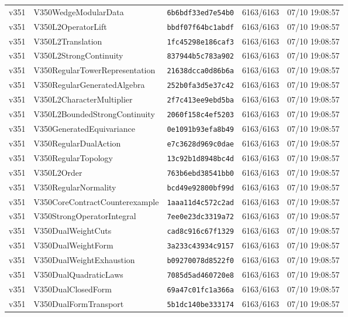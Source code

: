 \documentclass[11pt]{article}
\theoremstyle{definition}\newtheorem{deriv}{Derivation}
\begin{document}
{\begin{longtable}{@{}lllll@{}}
v351 & V350WedgeModularData & \texttt{6b6bdf33ed7e54b0} & 6163/6163 & 07/10 19:08:57 \\
v351 & V350L2OperatorLift & \texttt{bbdf07f64bc1abdf} & 6163/6163 & 07/10 19:08:57 \\
v351 & V350L2Translation & \texttt{1fc45298e186caf3} & 6163/6163 & 07/10 19:08:57 \\
v351 & V350L2StrongContinuity & \texttt{837944b5c783a902} & 6163/6163 & 07/10 19:08:57 \\
v351 & V350RegularTowerRepresentation & \texttt{21638dcca0d86b6a} & 6163/6163 & 07/10 19:08:57 \\
v351 & V350RegularGeneratedAlgebra & \texttt{252b0fa3d5e37c42} & 6163/6163 & 07/10 19:08:57 \\
v351 & V350L2CharacterMultiplier & \texttt{2f7c413ee9ebd5ba} & 6163/6163 & 07/10 19:08:57 \\
v351 & V350L2BoundedStrongContinuity & \texttt{2060f158c4ef5203} & 6163/6163 & 07/10 19:08:57 \\
v351 & V350GeneratedEquivariance & \texttt{0e1091b93efa8b49} & 6163/6163 & 07/10 19:08:57 \\
v351 & V350RegularDualAction & \texttt{e7c3628d969c0dae} & 6163/6163 & 07/10 19:08:57 \\
v351 & V350RegularTopology & \texttt{13c92b1d8948bc4d} & 6163/6163 & 07/10 19:08:57 \\
v351 & V350L2Order & \texttt{763b6ebd38541bb0} & 6163/6163 & 07/10 19:08:57 \\
v351 & V350RegularNormality & \texttt{bcd49e92800bf99d} & 6163/6163 & 07/10 19:08:57 \\
v351 & V350CoreContractCounterexample & \texttt{1aaa11d4c572c2ad} & 6163/6163 & 07/10 19:08:57 \\
v351 & V350StrongOperatorIntegral & \texttt{7ee0e23dc3319a72} & 6163/6163 & 07/10 19:08:57 \\
v351 & V350DualWeightCuts & \texttt{cad8c916c67f1329} & 6163/6163 & 07/10 19:08:57 \\
v351 & V350DualWeightForm & \texttt{3a233c43934c9157} & 6163/6163 & 07/10 19:08:57 \\
v351 & V350DualWeightExhaustion & \texttt{b09270078d8522f0} & 6163/6163 & 07/10 19:08:57 \\
v351 & V350DualQuadraticLaws & \texttt{7085d5ad460720e8} & 6163/6163 & 07/10 19:08:57 \\
v351 & V350DualClosedForm & \texttt{69a47c01fc1a366a} & 6163/6163 & 07/10 19:08:57 \\
v351 & V350DualFormTransport & \texttt{5b1dc140be333174} & 6163/6163 & 07/10 19:08:57 \\

\end{longtable}}
\end{document}
